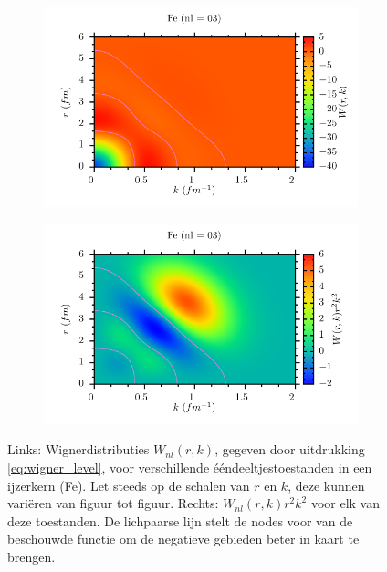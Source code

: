 \documentclass[11pt,twoside]{book}
\begin{document}
\begin{figure}
\begin{subfigure}[b]{0.49\textwidth}
 \end{subfigure} 
 \begin{subfigure}[b]{0.49\textwidth} 
 	\includegraphics[width=\textwidth]{./figuren/Fe_wigner_03.pdf}  
 \end{subfigure} 
 \begin{subfigure}[b]{0.49\textwidth} 
 	\includegraphics[width=\textwidth]{./figuren/Fe_wigner_03prob.pdf}  
 \end{subfigure} 
 \caption{Links: Wignerdistributies $W_{nl}(r,k)$, gegeven door uitdrukking \eqref{eq:wigner_level}, voor verschillende \'{e}\'{e}ndeeltjestoestanden in een ijzerkern (Fe). Let steeds op de schalen van $r$ en $k$, deze kunnen vari\"{e}ren van figuur tot figuur. Rechts: $W_{nl}(r,k)r^2 k^2$ voor elk van deze toestanden. De lichpaarse lijn stelt de nodes voor van de beschouwde functie om de negatieve gebieden beter in kaart te brengen.}  \label{fig:wigner_iron}
\end{figure}
\end{document}

